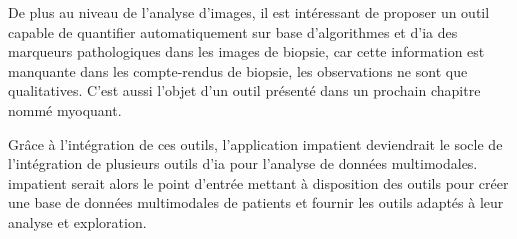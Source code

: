 De plus au niveau de l'analyse d'images, il est intéressant de proposer un outil capable de quantifier automatiquement sur base d'algorithmes et d'\gls{ia} des marqueurs pathologiques dans les images de biopsie, car cette information est manquante dans les compte-rendus de biopsie, les observations ne sont que qualitatives. C'est aussi l'objet d'un outil présenté dans un prochain chapitre nommé \gls{myoquant}.

Grâce à l'intégration de ces outils, l'application \gls{impatient} deviendrait le socle de l'intégration de plusieurs outils d'\gls{ia} pour l'analyse de données multimodales. \gls{impatient} serait alors le point d'entrée mettant à disposition des outils pour créer une base de données multimodales de patients et fournir les outils adaptés à leur analyse et exploration.